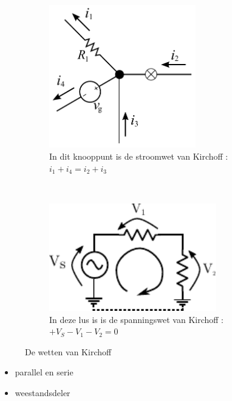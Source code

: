 \documentclass{article}
\begin{document}
\begin{figure}[htbp]
	\centering
	\begin{subfigure}[b]{0.45\linewidth}
		\centering
		\includegraphics[width=0.7\textwidth]{kcl.pdf}
		\caption{In dit knooppunt is de stroomwet van Kirchoff : $i_1 + i_4 = i_2+i_3$}
		\label{subfig:kcl}
	\end{subfigure}
	~
	\begin{subfigure}[b]{0.45\linewidth}
		\centering
		\includegraphics[width=0.8\textwidth]{kvl.pdf}
		\caption{In deze lus is is de spanningswet van Kirchoff : $ + V_S - V_1 - V_2 = 0$}
		\label{subfig:kvl}
	\end{subfigure}
\caption{De wetten van Kirchoff}
\label{fig:kirchoff}
\end{figure}

\begin{itemize}
	\item parallel en serie
	\item weestandsdeler
\end{itemize}
\end{document}
